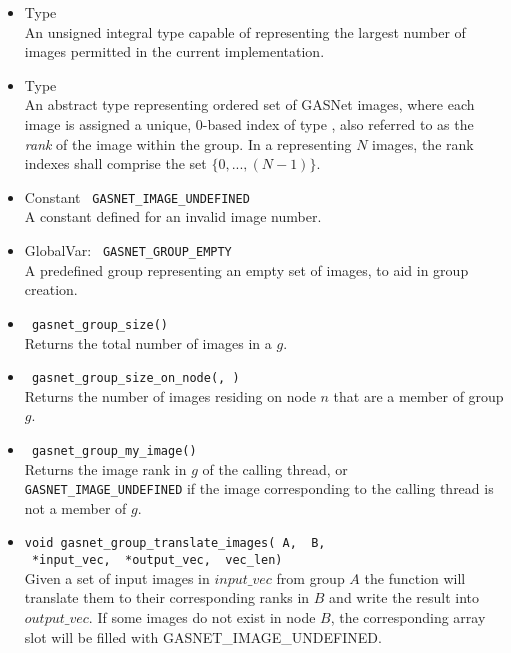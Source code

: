 \documentclass[times,10pt]{article}
\begin{document}
\begin{itemize}

\item Type \image \\
An unsigned integral type capable of representing the largest number of images
permitted in the current \gasnet implementation.

\item Type \group \\
An abstract type representing ordered set of GASNet images, where each image is 
assigned a unique, 0-based index of type \image, also referred to as the {\it rank} of the image within the group.
In a \group representing $N$ images, the rank indexes shall comprise the set $\{0, ... , (N-1)\}$.

\item Constant \texttt{\image\ GASNET\_IMAGE\_UNDEFINED } \\ 
A constant defined for an invalid image number. 

\item GlobalVar: \texttt{\group\ GASNET\_GROUP\_EMPTY} \\ 
A predefined group representing an empty set of images, to aid in group creation. 

\item \texttt{\image\ gasnet\_group\_size(\grouparg)}\\ 
Returns the total number of images in a \texttt{\group} $g$. 

\item \texttt{\image\ gasnet\_group\_size\_on\_node(\grouparg, \nodearg)} \\ 
Returns the number of images residing on node $n$ that are a member of group $g$. 

\item \texttt{\image\ gasnet\_group\_my\_image(\grouparg)} \\ 
Returns the image rank in $g$ of the calling thread, or \texttt{GASNET\_IMAGE\_UNDEFINED} 
if the image corresponding to the calling thread is not a member of $g$.

\item \texttt{void gasnet\_group\_translate\_images(\group\ A, \group\ B,\\ 
              \image\ *input\_vec, \image\ *output\_vec, \image\ vec\_len)} \\ 
Given a set of input images in $input\_vec$ from group $A$ the function will
translate them to their corresponding ranks in $B$ and write the result into
$output\_vec$. If some images do
not exist in node $B$, the corresponding array slot will be filled with
GASNET\_IMAGE\_UNDEFINED.


\end{itemize}
\end{document}

